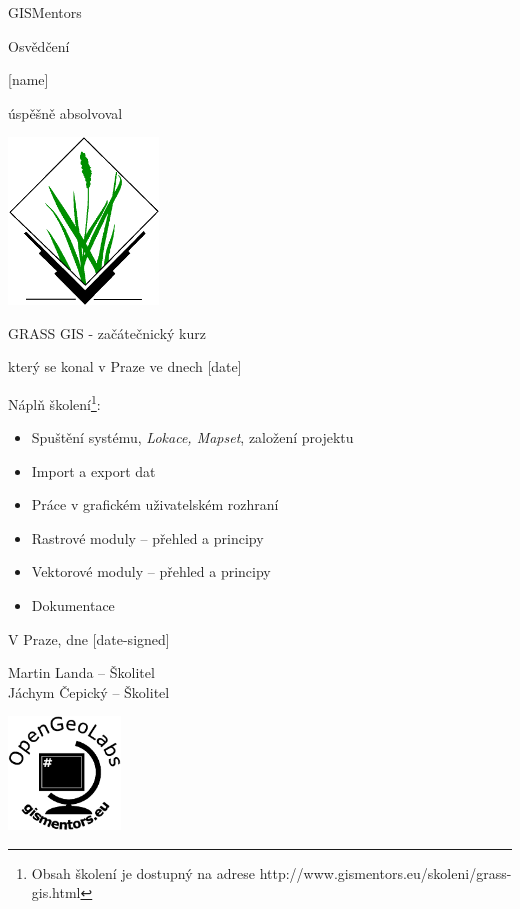 \documentclass[12pt, a4paper]{letter}
\begin{document}
\pagestyle{empty}
\begin{center}

{\Large GISMentors}

{\Huge Osvědčení}

{\Large [name]}

úspěšně absolvoval

\includegraphics[width=0.30\textwidth]{../images/grasslogo_vector.eps}

{\Large GRASS GIS - začátečnický kurz}

který se konal v Praze ve dnech [date]
\end{center}

Náplň školení\footnote{Obsah školení je dostupný
na adrese http://www.gismentors.eu/skoleni/grass-gis.html}:

\begin{itemize}
    \item Spuštění systému, \emph{Lokace, Mapset}, založení projektu
    \item Import a export dat
    \item Práce v grafickém uživatelském rozhraní
    \item Rastrové moduly – přehled a principy
    \item Vektorové moduly – přehled a principy
    \item Dokumentace
\end{itemize}

\vfill
\parbox{7cm}{

    V Praze, dne [date-signed]\\

\vfill

    Martin Landa -- Školitel\\

\vfill
    Jáchym Čepický -- Školitel
}
\hfill
\parbox{3cm}{
    \includegraphics[width=3cm]{../images/placka.eps}
}
\end{document}
